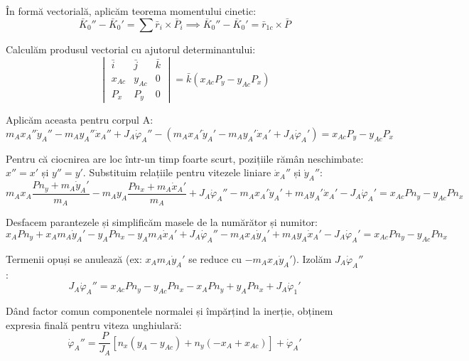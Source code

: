 \documentclass[12pt, a4paper]{article}
\begin{document}
În formă vectorială, aplicăm teorema momentului cinetic:
\begin{equation}
    \bar{K}_0'' - \bar{K}_0' = \sum \bar{r}_i \times \bar{P}_i \implies \bar{K}_0'' - \bar{K}_0' = \bar{r}_{1c} \times \bar{P} 
\end{equation}

Calculăm produsul vectorial cu ajutorul determinantului:
\begin{equation}
    \begin{vmatrix} 
    \bar{i} & \bar{j} & \bar{k} \\ 
    x_{Ac} & y_{Ac} & 0 \\ 
    P_x & P_y & 0 
    \end{vmatrix} = \bar{k}(x_{Ac} P_y - y_{Ac} P_x) 
\end{equation}

Aplicăm aceasta pentru corpul A:
\begin{equation}
    m_A x_A'' \dot{y}_A'' - m_A y_A'' \dot{x}_A'' + J_A \dot{\varphi}_A'' - (m_A x_A' \dot{y}_A' - m_A y_A' \dot{x}_A' + J_A \dot{\varphi}_A') = x_{Ac} P_y - y_{Ac} P_x 
\end{equation}

Pentru că ciocnirea are loc într-un timp foarte scurt, pozițiile rămân neschimbate: $x''=x'$ și $y''=y'$. Substituim relațiile pentru vitezele liniare $\dot{x}_A''$ și $\dot{y}_A''$:
\begin{equation}
    m_A x_A \frac{P n_y + m_A \dot{y}_A'}{m_A} - m_A y_A \frac{P n_x + m_A \dot{x}_A'}{m_A} + J_A \dot{\varphi}_A'' - m_A x_A' \dot{y}_A' + m_A y_A' \dot{x}_A' - J_A \dot{\varphi}_A' = x_{Ac} P n_y - y_{Ac} P n_x 
\end{equation}

Desfacem parantezele și simplificăm masele de la numărător și numitor:
\begin{equation}
    x_A P n_y + x_A m_A \dot{y}_A' - y_A P n_x - y_A m_A \dot{x}_A' + J_A \dot{\varphi}_A'' - m_A x_A \dot{y}_A' + m_A y_A \dot{x}_A' - J_A \dot{\varphi}_A' = x_{Ac} P n_y - y_{Ac} P n_x
\end{equation}

Termenii opuși se anulează (ex: $x_A m_A \dot{y}_A'$ se reduce cu $- m_A x_A \dot{y}_A'$). Izolăm $J_A \dot{\varphi}_A''$:
\begin{equation}
    J_A \dot{\varphi}_A'' = x_{Ac} P n_y - y_{Ac} P n_x - x_A P n_y + y_A P n_x + J_A \dot{\varphi}_1'
\end{equation}

Dând factor comun componentele normalei și împărțind la inerție, obținem expresia finală pentru viteza unghiulară:
\begin{equation}
    \dot{\varphi}_A'' = \frac{P}{J_A} \left[ n_x(y_A - y_{Ac}) + n_y(-x_A + x_{Ac}) \right] + \dot{\varphi}_A' 
\end{equation}
\end{document}
